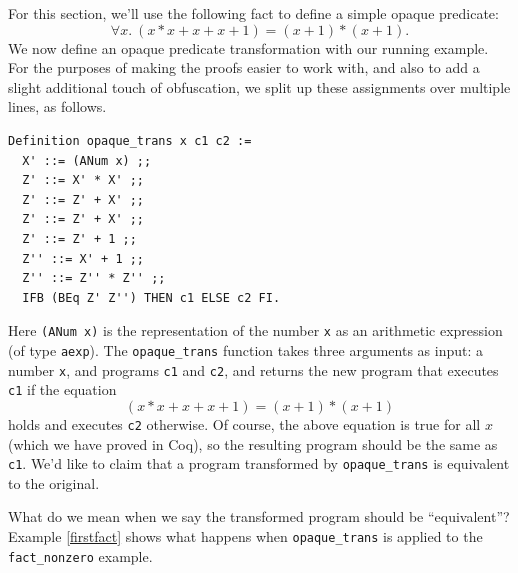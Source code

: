 \documentclass[compsoc,conference,a4paper,10pt,times]{IEEEtran}
\newtheorem{lemma}[theorem]{Lemma}
\begin{document}
For this section, we'll use the following fact to define a simple opaque predicate:
    \[
    	\forall x.\ (x * x + x + x + 1) = (x + 1) * (x + 1).
    \]
We now define an opaque predicate transformation with our running example.  
    For the purposes of making the proofs easier to work with, and also to add a slight additional touch of obfuscation, we split up these assignments over multiple lines, as follows.
\begin{verbatim}
Definition opaque_trans x c1 c2 :=
  X' ::= (ANum x) ;;
  Z' ::= X' * X' ;;
  Z' ::= Z' + X' ;;
  Z' ::= Z' + X' ;;
  Z' ::= Z' + 1 ;;
  Z'' ::= X' + 1 ;;
  Z'' ::= Z'' * Z'' ;;
  IFB (BEq Z' Z'') THEN c1 ELSE c2 FI.
\end{verbatim}
Here \texttt{(ANum x)} is the representation of the number \texttt{x} as an arithmetic expression (of type \texttt{aexp}).  The \texttt{opaque\_trans} function takes three arguments as input: a number \texttt{x}, and programs \texttt{c1} and \texttt{c2}, and returns the new program that executes \texttt{c1} if the equation
\[
	(x * x + x + x + 1) = (x + 1) * (x + 1)
\]
holds and executes \texttt{c2} otherwise.  Of course, the above equation is true for all $x$ (which we have proved in Coq), so the resulting program should be the same as \texttt{c1}.  We'd like to claim that a program transformed by \texttt{opaque\_trans} is equivalent to the original.

What do we mean when we say the transformed program should be ``equivalent''?  Example \ref{firstfact} shows what happens when \texttt{opaque\_trans} is applied to the \texttt{fact\_nonzero} example.  


\end{document}

